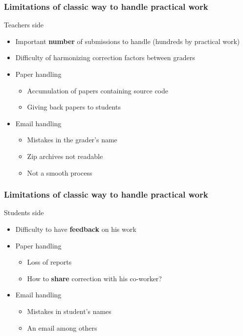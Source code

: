 \documentclass[svgnames,hyperref, english, xcolor=dvipsnames,usenames]{beamer}					      %
\begin{document}
\frame
{
        \frametitle{Limitations of classic way to handle practical work}

        \begin{alertblock}{Teachers side}
                \begin{itemize}
                        \item Important \textbf{number} of submissions to handle (hundreds by practical work)
                        \item Difficulty of harmonizing correction factors between graders
                        \item Paper handling
                                \begin{itemize}
                                        \item Accumulation of papers containing source code
                                        \item Giving back papers to students
                                \end{itemize}
                        \item Email handling
                                \begin{itemize}
                                        \item Mistakes in the grader's name
                                        \item Zip archives not readable
                                        \item Not a smooth process
                                \end{itemize}
                \end{itemize}
        \end{alertblock}
}

\frame
{
        \frametitle{Limitations of classic way to handle practical work}

        \begin{alertblock}{Students side}
                \begin{itemize}
                        \item Difficulty to have \textbf{feedback} on his work
                        \item Paper handling
                                \begin{itemize}
                                        \item Loss of reports
                                        \item How to \textbf{share} correction with his co-worker?
                                \end{itemize}
                        \item Email handling
                                \begin{itemize}
                                        \item Mistakes in student's names
                                        \item An email among others
                                \end{itemize}
                \end{itemize}
        \end{alertblock}
}
\end{document}
